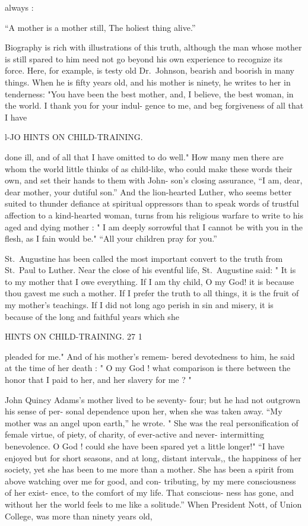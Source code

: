 \documentclass[
]{book}
\begin{document}
always :

``A mother is a mother still, The holiest thing alive.''

Biography is rich with illustrations of this truth, although the man whose mother is still spared to him need not go beyond his own experience to recognize its force. Here, for example, is testy old Dr.~Johnson, bearish and boorish in many things. When he is fifty years old, and his mother is ninety, he writes to her in tenderness: "You have been the best mother, and, I believe, the best woman, in the world. I thank you for your indul- gence to me, and beg forgiveness of all that I have

l-JO HINTS ON CHILD-TRAINING.

done ill, and of all that I have omitted to do well." How many men there are whom the world little thinks of as child-like, who could make these words their own, and set their hands to them with John- son's closing assurance, ``I am, dear, dear mother, your dutiful son.'' And the lion-hearted Luther, who seems better suited to thunder defiance at spiritual oppressors than to speak words of trustful affection to a kind-hearted woman, turns from his religious warfare to write to his aged and dying mother : " I am deeply sorrowful that I cannot be with you in the flesh, as I fain would be." ``All your children pray for you.''

St.~Augustine has been called the most important convert to the truth from St.~Paul to Luther. Near the close of his eventful life, St.~Augustine said: " It is to my mother that I owe everything. If I am thy child, O my God! it is because thou gavest me such a mother. If I prefer the truth to all things, it is the fruit of my mother's teachings. If I did not long ago perish in sin and misery, it is because of the long and faithful years which she

HINTS ON CHILD-TRAINING. 27 1

pleaded for me." And of his mother's remem- bered devotedness to him, he said at the time of her death : " O my God ! what comparison is there between the honor that I paid to her, and her slavery for me ? "

John Quincy Adams's mother lived to be seventy- four; but he had not outgrown his sense of per- sonal dependence upon her, when she was taken away. ``My mother was an angel upon earth,'' he wrote. " She was the real personification of female virtue, of piety, of charity, of ever-active and never- intermitting benevolence. O God ! could she have been spared yet a little longer!" ``I have enjoyed but for short seasons, and at long, distant intervals,, the happiness of her society, yet she has been to me more than a mother. She has been a spirit from above watching over me for good, and con- tributing, by my mere consciousness of her exist- ence, to the comfort of my life. That conscious- ness has gone, and without her the world feels to me like a solitude.'' When President Nott, of Union College, was more than ninety years old,
\end{document}
